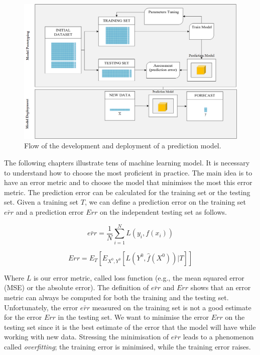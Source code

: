 \begin{figure}[hbt!]
\centering
\includegraphics[width=1\textwidth]{SectionLetsMath/linearRegression_figures/fig_trainTest.png}
\captionsetup{type=figure}
\caption{Flow of the development and deployment of a prediction model.}
\label{fig_trainTest}
\end{figure}

The following chapters illustrate tens of machine learning model. It is necessary to understand how to choose the most proficient in practice. The main idea is to have an error metric and to choose the model that minimises the most this error metric. The prediction error can be calculated for the training set or the testing set. Given a training set $T$, we can define a prediction error on the training set  $\bar{err}$ and a prediction error $Err$ on the independent testing set as follows.

\begin{equation}
\bar{err}=\frac{1}{N}\sum_{i=1}^{N}L\left(y_i,f\left(x_i\right)\right)
\label{eq_trainTestError1}
\end{equation}

\begin{equation}
Err=E_{T}\left[E_{X^0,Y^0}\left[L\left(Y^0,\hat{f}(X^0)\right)|T\right]\right]
\label{eq_trainTestError2}
\end{equation}

Where $L$ is our error metric, called loss function (e.g., the mean squared error (MSE) or the absolute error). The definition of $\bar{err}$ and $Err$ shows that an error metric can always be computed for both the training and the testing set. Unfortunately, the error $\bar{err}$ measured on the training set is not a good estimate for the error $Err$ in the testing set. We want to minimise the error $Err$ on the testing set since it is the best estimate of the error that the model will have while working with new data. Stressing the minimisation of $\bar{err}$ leads to a phenomenon called \textit{overfitting}; the training error is minimised, while the training error raises.\par


